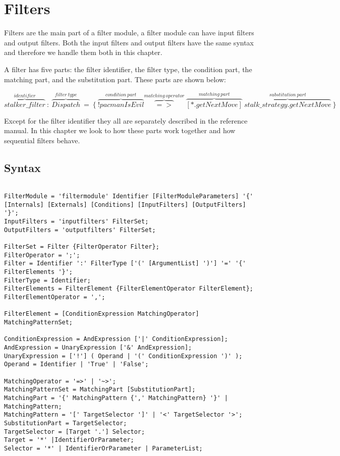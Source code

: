 \chapter{Filters} \label{chapter:filter}
Filters are the main part of a filter module, a filter module can have input filters and output filters.
Both the input filters and output filters have the same syntax and therefore we handle them both in this chapter.

A filter has five parts: the filter identifier, the filter type, the condition part, the matching part, and the substitution part. These parts are shown below:

\begin{center}
$\overbrace{stalker\_filter}^{identifier}~:~\overbrace{Dispatch}^{filter~type}~=~\{~\overbrace{!pacmanIsEvil}^{condition~part} 

\overbrace{=>}^{matching~operator}~\overbrace{[*.getNextMove]}^{matching~part}~\overbrace{stalk\_strategy.getNextMove}^{substitution~part}~\}$
\end{center}

Except for the filter identifier they all are separately described in the reference manual. 
In this chapter we look to how these parts work together and how sequential filters behave.

\section{Syntax} %
\begin{lstlisting}[caption = {Filter syntax}, label = lst::ARM:fil:syntax,
style = listing, language = ebnf, float = tpb]

FilterModule = 'filtermodule' Identifier [FilterModuleParameters] '{' [Internals] [Externals] [Conditions] [InputFilters] [OutputFilters] '}';
InputFilters = 'inputfilters' FilterSet;
OutputFilters = 'outputfilters' FilterSet;

FilterSet = Filter {FilterOperator Filter};
FilterOperator = ';';
Filter = Identifier ':' FilterType ['(' [ArgumentList] ')'] '=' '{' FilterElements '}';
FilterType = Identifier;
FilterElements = FilterElement {FilterElementOperator FilterElement};
FilterElementOperator = ',';

FilterElement = [ConditionExpression MatchingOperator] MatchingPatternSet;

ConditionExpression = AndExpression ['|' ConditionExpression];
AndExpression = UnaryExpression ['&' AndExpression];
UnaryExpression = ['!'] ( Operand | '(' ConditionExpression ')' );
Operand = Identifier | 'True' | 'False';

MatchingOperator = '=>' | '~>';
MatchingPatternSet = MatchingPart [SubstitutionPart];
MatchingPart = '{' MatchingPattern {',' MatchingPattern} '}' | MatchingPattern;
MatchingPattern = '[' TargetSelector ']' | '<' TargetSelector '>';
SubstitutionPart = TargetSelector;
TargetSelector = [Target '.'] Selector;
Target = '*' |IdentifierOrParameter;
Selector = '*' | IdentifierOrParameter | ParameterList;
\end{lstlisting}

